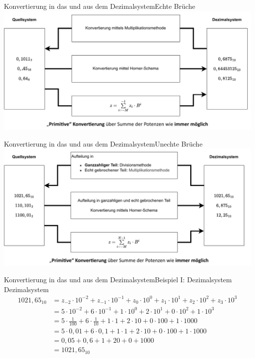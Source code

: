 \documentclass[xelatex,aspectratio=169]{beamer}
\begin{document}
\begin{frame}{Konvertierung in das und aus dem Dezimalsystem}{Echte Brüche}
  \centering
  \includegraphics[height=.8\textheight]{fig/zahlensysteme_konvertierung_rational_echt.pdf}
\end{frame}

\begin{frame}{Konvertierung in das und aus dem Dezimalsystem}{Unechte Brüche}
  \centering
  \includegraphics[height=.8\textheight]{fig/zahlensysteme_konvertierung_rational_unecht.pdf}
\end{frame}

\begin{frame}{Konvertierung in das und aus dem Dezimalsystem}{Beispiel I: Dezimalsystem \textrightarrow Dezimalsystem}
  \begin{align*}
    1021,65_{10} & = z_{-2} \cdot 10^{-2} + z_{-1} \cdot 10^{-1} + z_0 \cdot 10^0 + z_1 \cdot 10^1 + z_2 \cdot 10^2 + z_3 \cdot 10^3 \\
                 & = 5 \cdot 10^{-2} + 6 \cdot 10^{-1} + 1 \cdot 10^0 + 2 \cdot 10^1 + 0 \cdot 10^2 + 1 \cdot 10^3                   \\
                 & = 5 \cdot \frac{1}{100} + 6 \cdot \frac{1}{10} + 1 \cdot 1 + 2 \cdot 10 + 0 \cdot 100 + 1 \cdot 1000              \\
                 & = 5 \cdot 0,01 + 6 \cdot 0,1 + 1 \cdot 1 + 2 \cdot 10 + 0 \cdot 100 + 1 \cdot 1000                                \\
                 & = 0,05 + 0,6 + 1 + 20 + 0 + 1000                                                                                  \\
                 & = 1021,65_{10}
  \end{align*}
\end{frame}
\end{document}
